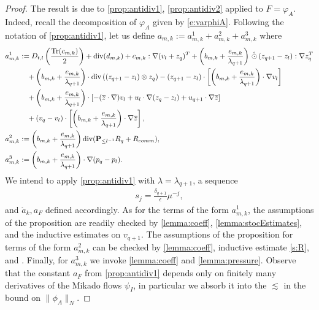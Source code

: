 \documentclass[10pt,a4paper]{amsart}
\numberwithin{equation}{section}
\numberwithin{corollario}{section}
\numberwithin{lemma}{section}
\numberwithin{prop}{section}
\theoremstyle{definition}
\theoremstyle{remark}
\newcommand{\dvg}{\mathord{{\rm div}}}
\newcommand{\varz}{\overline{z}}
\newcommand{\proj}{\mathbf{P}}
\DeclareMathOperator{\Tr}{Tr}
\newcommand{\qq}{_{q+1}}
\newcommand{\SymOtNoTr}{\,\mathring{\odot}\,}
\begin{document}
\begin{proof}
The result is due to \autoref{prop:antidiv1}, \autoref{prop:antidiv2} applied to $F=\varphi_A$. Indeed, recall the decomposition of $\varphi_A$ given by \eqref{e:varphiA}. Following the notation of \autoref{prop:antidiv1}, let us define $a_{m,k} := a^1_{m,k}+a^2_{m,k}+a^3_{m,k}$ where
\begin{align}
    a_{m,k}^1&:=D_{t,l}\left(\frac{\Tr(c_{m,k})}2\right)+\dvg (d_{m,k})+c_{m,k}:\nabla(v_l+z_q)^T+\left(   b_{m,k}+\frac{e_{m,k}}{\lambda\qq}\right)\SymOtNoTr (z\qq-z_l):\nabla z_q^T\\
    &\quad+
    \left(   b_{m,k}+\frac{e_{m,k}}{\lambda\qq}\right)\cdot \dvg\left((z\qq-z_l)\otimes z_q\right)-(z\qq-z_l)\cdot\left[\left(b_{m,k}+\frac{e_{m,k}}{\lambda\qq}\right)\cdot \nabla v_l\right]\\
    &\quad+
    \left(b_{m,k}+\frac{e_{m,k}}{\lambda\qq}\right)\cdot\left[-(\overline{z}\cdot \nabla)v_l+u_l\cdot \nabla (z_q-z_l)+u\qq\cdot \nabla \varz
    \right]\\
    &\quad+
    (v_q-v_l)\cdot\left[\left(b_{m,k}+\frac{e_{m,k}}{\lambda\qq}\right)\cdot \nabla \varz \right],
  \\
    a_{m,k}^2&:=\left(b_{m,k}+\frac{e_{m,k}}{\lambda\qq}\right)\dvg(\proj_{\le l^{-1}}R_q+R_{comm}),\\
    a_{m,k}^3&:=\left(b_{m,k}+\frac{e_{m,k}}{\lambda\qq}\right)\cdot \nabla (p_q-p_l).
\end{align}
We intend to apply \autoref{prop:antidiv1} with $\lambda=\lambda\qq$, a sequence 
\begin{align}
    s_j = \frac{\delta\qq}{\epsilon} \mu^{-j},
\end{align}
and $\mathring{a}_k, a_F$ defined accordingly.
As for the terms of the form $a_{m,k}^1$, the assumptions of the proposition are readily checked by \autoref{lemma:coeff}, \autoref{lemma:stocEstimates}, and the inductive estimates on $v\qq$.
The assumptions of the proposition for terms of the form $a_{m,k}^2$ can be checked by \autoref{lemma:coeff}, inductive estimate \eqref{s:R}, and \cite[Lemma A.3]{DLK23}. 
Finally, for $a_{m,k}^3$ we invoke \autoref{lemma:coeff} and \autoref{lemma:pressure}. 
Observe that the constant $a_F$ from \autoref{prop:antidiv1} depends only on finitely many derivatives of the Mikado flows $\psi_I$, in particular we absorb it into the $\lesssim$ in the bound on $\|\phi_A\|_N $.


\end{proof}
\end{document}
